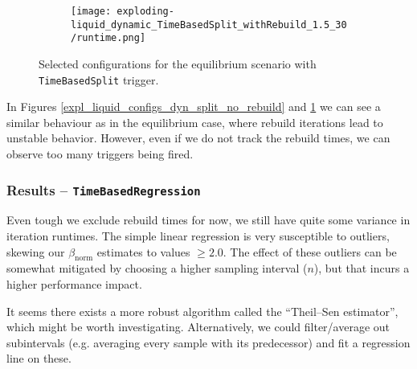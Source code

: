 \documentclass[]{article}
\begin{document}
\begin{figure}[H]
\begin{center}
\begin{subfigure}[b]{0.3\textwidth}
		\end{subfigure}
		\begin{subfigure}[b]{0.3\textwidth}
			\texttt{[image: exploding-liquid\_dynamic\_TimeBasedSplit\_withRebuild\_1.5\_30/runtime.png]}
		\end{subfigure}
	\end{center}
	\caption[]{Selected configurations for the equilibrium scenario with \texttt{TimeBasedSplit} trigger.}
	\label{expl_liquid_configs_dyn_split_with_rebuild}
\end{figure}

In Figures \ref{expl_liquid_configs_dyn_split_no_rebuild} and \ref{expl_liquid_configs_dyn_split_with_rebuild} we can see a similar behaviour as in the equilibrium case, where rebuild iterations lead to unstable behavior. However, even if we do not track the rebuild times, we can observe too many triggers being fired.


\subsubsection{Results -- \texttt{TimeBasedRegression}}
Even tough we exclude rebuild times for now, we still have quite some variance in iteration runtimes. The simple linear regression is very susceptible to outliers, skewing our $\beta_{\text{norm}}$ estimates to values $\ge 2.0$. The effect of these outliers can be somewhat mitigated by choosing a higher sampling interval ($n$), but that incurs a higher performance impact.

It seems there exists a more robust algorithm called the \enquote{Theil–Sen estimator}, which might be worth investigating.
Alternatively, we could filter/average out subintervals (e.g. averaging every sample with its predecessor) and fit a regression line on these.
\end{document}
